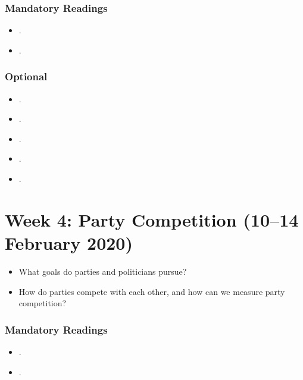 \documentclass[abstract=on,parskip=full,headings=standardclasses,fontsize=11pt,paper=a4]{scrartcl}
\begin{document}
\subsubsection*{Mandatory Readings}

\begin{itemize}
\item {}.
\item {}.
\end{itemize}



\subsubsection*{Optional}
\begin{itemize}
\item {}.
\item {}.
\item {}.
\item {}.
\item {}.
\end{itemize}







\section{Week 4:  Party Competition (10--14 February 2020)}

\begin{itemize}
\renewcommand\labelitemi{--}
\item What goals do parties and politicians pursue?
\item How do parties compete with each other, and how can we measure party competition?
\end{itemize}

\subsubsection*{Mandatory Readings}
\begin{itemize}
\item {}.
\item {}.
\end{itemize}
\end{document}
